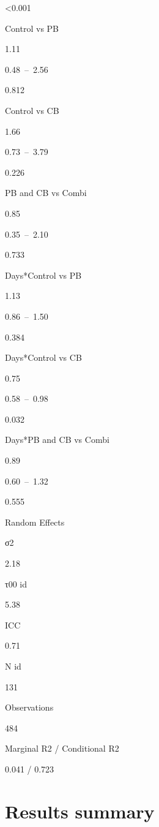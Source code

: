 \documentclass[
]{article}
\begin{document}
\textless0.001

Control vs PB

1.11

0.48~--~2.56

0.812

Control vs CB

1.66

0.73~--~3.79

0.226

PB and CB vs Combi

0.85

0.35~--~2.10

0.733

Days*Control vs PB

1.13

0.86~--~1.50

0.384

Days*Control vs CB

0.75

0.58~--~0.98

0.032

Days*PB and CB vs Combi

0.89

0.60~--~1.32

0.555

Random Effects

σ2

2.18

τ00 id

5.38

ICC

0.71

N id

131

Observations

484

Marginal R2 / Conditional R2

0.041 / 0.723

\hypertarget{results-summary}{%
\section{Results summary}\label{results-summary}}
\end{document}
